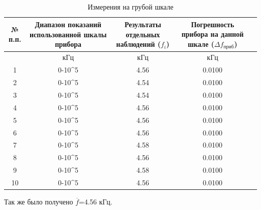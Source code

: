 \begin{center}
\begin{table}[h!]
\centering
\caption{Измерения на грубой шкале}
\label{tabl:1}
\begin{tabular}{|c|c|c|c|c|}
\hline
\begin{minipage}{7mm}
    № п.п. 
\end{minipage}&
\begin{minipage}{5cm}
    Диапазон показаний использованной шкалы прибора
\end{minipage} &
\begin{minipage}{5cm}
    Результаты отдельных наблюдений ($f_i$)
\end{minipage} &
\begin{minipage}{5cm}
    Погрешность прибора на данной шкале ($\Delta f_{\text{приб}}$)
\end{minipage}\\
\hline
{}&кГц&кГц&кГц\\
\hline
1 &  0-10^5  &  4.56  &  0.0100 \\
2 &  0-10^5  &  4.54  &  0.0100 \\
3 &  0-10^5  &  4.54  &  0.0100 \\
4 &  0-10^5  &  4.56  &  0.0100 \\
5 & 0-10^5  &  4.56  &  0.0100 \\
6 & 0-10^5  &  4.56  &  0.0100 \\
7 & 0-10^5  &  4.58  &  0.0100 \\
8 & 0-10^5  &  4.56  &  0.0100 \\
9 & 0-10^5  &  4.58  &  0.0100 \\
10& 0-10^5  &  4.56  &  0.0100 \\
\hline
\end{tabular}
\end{table}
\end{center}
Так же было получено $\overline{f}$=4.56 кГц.\\

